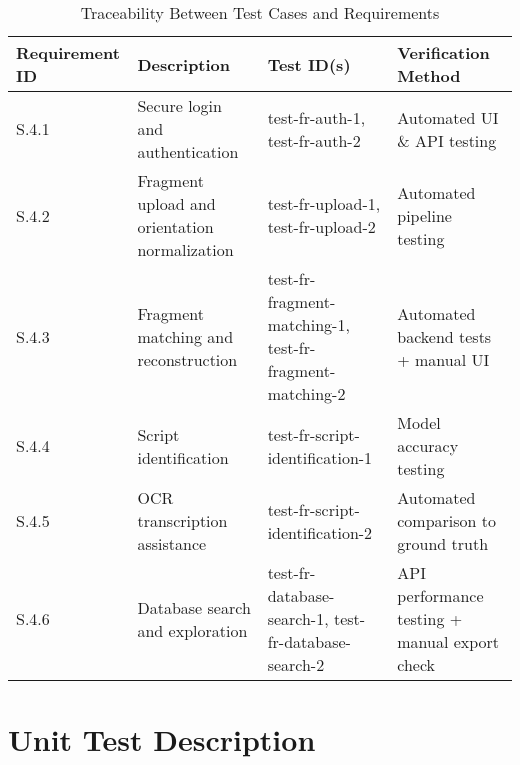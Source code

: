 \documentclass[12pt, titlepage]{article}
\begin{document}
\begin{table}[ht]
\centering
\begin{tabular}{|p{3cm}|p{5cm}|p{3cm}|p{3cm}|}
\hline
\textbf{Requirement ID} & \textbf{Description} & \textbf{Test ID(s)} & \textbf{Verification Method} \\
\hline
S.4.1 & Secure login and authentication & test-fr-auth-1, test-fr-auth-2 & Automated UI \& API testing \\
\hline
S.4.2 & Fragment upload and orientation normalization & test-fr-upload-1, test-fr-upload-2 & Automated pipeline testing \\
\hline
S.4.3 & Fragment matching and reconstruction & test-fr-fragment-matching-1, test-fr-fragment-matching-2 & Automated backend tests + manual UI \\
\hline
S.4.4 & Script identification & test-fr-script-identification-1 & Model accuracy testing \\
\hline
S.4.5 & OCR transcription assistance & test-fr-script-identification-2 & Automated comparison to ground truth \\
\hline
S.4.6 & Database search and exploration & test-fr-database-search-1, test-fr-database-search-2 & API performance testing + manual export check \\
\hline
\end{tabular}
\caption{Traceability Between Test Cases and Requirements}
\end{table}

\section{Unit Test Description}



\end{document}
